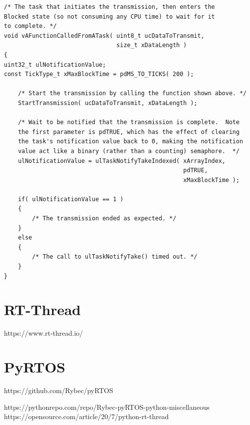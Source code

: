 \begin{verbatim}
/* The task that initiates the transmission, then enters the
Blocked state (so not consuming any CPU time) to wait for it
to complete. */
void vAFunctionCalledFromATask( uint8_t ucDataToTransmit,
                                size_t xDataLength )
{
uint32_t ulNotificationValue;
const TickType_t xMaxBlockTime = pdMS_TO_TICKS( 200 );

    /* Start the transmission by calling the function shown above. */
    StartTransmission( ucDataToTransmit, xDataLength );

    /* Wait to be notified that the transmission is complete.  Note
    the first parameter is pdTRUE, which has the effect of clearing
    the task's notification value back to 0, making the notification
    value act like a binary (rather than a counting) semaphore.  */
    ulNotificationValue = ulTaskNotifyTakeIndexed( xArrayIndex,
                                                   pdTRUE,
                                                   xMaxBlockTime );

    if( ulNotificationValue == 1 )
    {
        /* The transmission ended as expected. */
    }
    else
    {
        /* The call to ulTaskNotifyTake() timed out. */
    }
}

\end{verbatim}












\section{RT-Thread}

https://www.rt-thread.io/

\section{PyRTOS}

https://github.com/Rybec/pyRTOS

https://pythonrepo.com/repo/Rybec-pyRTOS-python-miscellaneous
https://opensource.com/article/20/7/python-rt-thread



